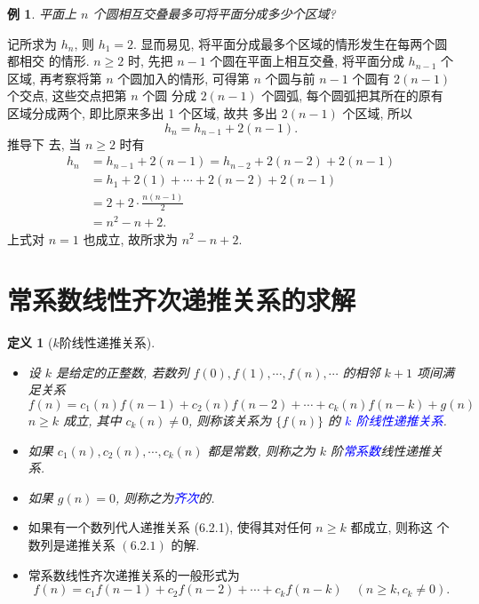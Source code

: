 \documentclass[punct]{ctexbeamer}
\newtheorem{defi}[thm]{定义}
\newtheorem{ex}{例}[section]
\newcommand{\blue}{\textcolor{blue}}
\def\sol{\noindent {\bf 解\ }}
\begin{document}
\begin{frame}
    \begin{ex}
        平面上 $n$ 个圆相互交叠最多可将平面分成多少个区域?
    \end{ex}
    \pause
    \sol 记所求为 $h_n$, 则 $h_1=2$. 显而易见, 将平面分成最多个区域的情形发生在每两个圆都相交 的情形. $n \geqslant 2$ 时, 先把 $n-1$ 个圆在平面上相互交叠, 将平面分成 $h_{n-1}$ 个区域, 再考察将第 $n$ 个圆加入的情形, 可得第 $n$ 个圆与前 $n-1$ 个圆有 $2(n-1)$ 个交点, 这些交点把第 $n$ 个圆 分成 $2(n-1)$ 个圆弧, 每个圆弧把其所在的原有区域分成两个, 即比原来多出 1 个区域, 故共 多出 $2(n-1)$ 个区域, 所以
    $$
    h_n=h_{n-1}+2(n-1) .
    $$
    \pause
    推导下
    去, 当 $n \geq 2$ 时有
    $$
    \begin{aligned}
        h_n &=h_{n-1}+2(n-1) =h_{n-2}+2(n-2)+2(n-1) \\
        &=h_1+2(1)+\cdots+2(n-2)+2(n-1) \\
        &=2+2 \cdot \frac{n(n-1)}{2} \\
        &=n^2-n+2 .
    \end{aligned}
    $$
    上式对 $n=1$ 也成立, 故所求为 $n^2-n+2$.
\end{frame}
\section{常系数线性齐次递推关系的求解}

\begin{frame}
	\begin{defi}[$k$阶线性递推关系]
        \begin{itemize}
\item 设 $k$ 是给定的正整数, 若数列 $f(0), f(1), \cdots, f(n), \cdots$ 的相邻 $k+1$ 项间满足关系
\[
f(n)=c_1(n) f(n-1)+c_2(n) f(n-2)+\cdots+c_k(n) f(n-k)+g(n)\tag{6.2.1}
\]
$n \geqslant k$ 成立, 其中 $c_k(n) \neq 0$, 则称该关系为 $\{f(n)\}$ 的 \blue{$k$ 阶线性递推关系}.

\item 如果 $c_1(n), c_2(n), \cdots, c_k(n)$ 都是常数, 则称之为 $k$ 阶\blue{常系数}线性递推关系.

\item 如果 $g(n)=0$, 则称之为\blue{齐次}的.
        \end{itemize}

	\end{defi}
\begin{itemize}
	\item 如果有一个数列代人递推关系 (6.2.1), 使得其对任何 $n \geqslant k$ 都成立, 则称这 个数列是递推关系 $(6.2 .1)$ 的解.
	\item 常系数线性齐次递推关系的一般形式为
	\[
	f(n)=c_1 f(n-1)+c_2 f(n-2)+\cdots
	+c_k f(n-k) \quad\left(n \geqslant k, c_k \neq 0\right) . \tag{6.2.2}
	\]
\end{itemize}
\end{frame}
\end{document}
